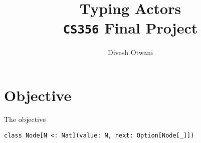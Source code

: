 \documentclass[12pt]{article}
\title{Typing Actors \\ \large \texttt{CS356} Final Project}
\author{Divesh Otwani}
\begin{document}
\maketitle

\section{Objective}
The objective 

 

\begin{lstlisting}
class Node[N <: Nat](value: N, next: Option[Node[_]])

\end{lstlisting}
\end{document}
